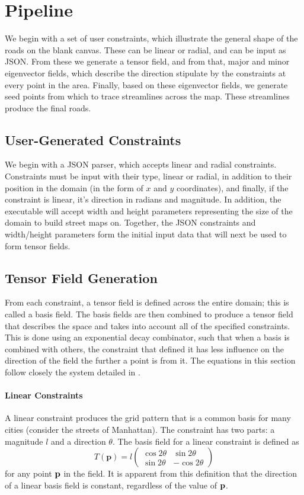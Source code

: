 \documentclass[twocolumn]{article}
\newcommand{\sqmat}[4]{\ensuremath{
    \left(\begin{array}{cc}
        #1 & #2 \\
        #3 & #4
    \end{array}\right)}}
\newcommand{\pt}{\textbf{p}}
\newcommand{\todo}[1]{\begin{center}\fbox{\parbox{150pt}{#1}}\end{center}}
\begin{document}
\section{Pipeline}
We begin with a set of user constraints, which illustrate the general shape of
the roads on the blank canvas. These can be linear or radial, and can be input
as JSON. From these we generate a tensor field, and from that, major and minor
eigenvector fields, which describe the direction stipulate by the constraints at
every point in the area. Finally, based on these eigenvector fields, we generate
seed points from which to trace streamlines across the map. These streamlines
produce the final roads.

\todo{insert pipeline diagram}

\subsection{User-Generated Constraints}
We begin with a JSON parser, which accepts linear and radial constraints.
Constraints must be input with their type, linear or radial, in addition to
their position in the domain (in the form of $x$ and $y$ coordinates), and
finally, if the constraint is linear, it’s direction in radians and magnitude.
In addition, the executable will accept width and height parameters
representing the size of the domain to build street maps on. Together, the JSON
constraints and width/height parameters form the initial input data that will
next be used to form tensor fields.

\subsection{Tensor Field Generation}
From each constraint, a tensor field is defined across the entire domain; this
is called a basis field. The basis fields are then combined to produce a tensor
field that describes the space and takes into account all of the specified
constraints. This is done using an exponential decay combinator, such that when
a basis is combined with others, the constraint that defined it has less
influence on the direction of the field the further a point is from it. The
equations in this section follow closely the system detailed in \cite{chen}.

\paragraph{Linear Constraints}
A linear constraint produces the grid pattern that is a common basis for many
cities (consider the streets of Manhattan). The constraint has two parts: a
magnitude $l$ and a direction $\theta$. The basis field for a linear constraint
is defined as
\[
    T(\pt) =
        l\sqmat{\cos{2\theta}}{\sin{2\theta}}{\sin{2\theta}}{-\cos{2\theta}}
\]
for any point $\bf p$ in the field. It is apparent from this definition that
the direction of a linear basis field is constant, regardless of the value of
$\bf p$.
\end{document}
